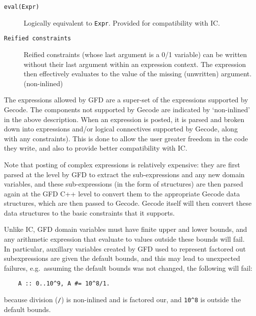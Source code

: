\begin{description}
\item[\texttt{eval(Expr)}]
            Logically equivalent to \verb'Expr'. Provided for compatibility
	    with IC.

\item[\texttt{Reified constraints}]
            Reified constraints (whose last argument is a 0/1 variable)
            can be written without their last argument within
            an expression context.  The expression then effectively
            evaluates to the value of the missing (unwritten) argument.
	    (non-inlined)

\end{description}
 
The expressions allowed by GFD are a super-set of the expressions supported by 
Gecode. The components not supported by Gecode are indicated by `non-inlined'
in the above description. When an expression is posted, it is parsed and 
broken down into expressions and/or logical connectives supported by Gecode, 
along 
with any constraints). This is done to 
allow the user greater freedom in the code they write, and also to provide 
better compatibility with IC. 

Note that posting of complex expressions is relatively expensive: they are 
first parsed at the {\eclipse} level by GFD to extract the sub-expressions and 
any new domain variables, and these sub-expressions (in the form of 
{\eclipse} structures) are then parsed again at the GFD C++ level to convert
them to the appropriate Gecode data structures, which are then passed to
Gecode. Gecode itself will then convert these data structures
to the basic constraints that it supports. 

Unlike IC, GFD domain variables must have finite upper and lower 
bounds, and any arithmetic expression that evaluate to values outside
these bounds will fail. In particular, auxillary variables created by GFD
used to represent factored out subexpressions are given the default bounds,
and this may lead to unexpected failures, e.g.\ assuming the default bounds
was not changed, the following will fail:
\begin{verbatim}
    A :: 0..10^9, A #= 10^8/1.
\end{verbatim}
\noindent
because division (\texttt{/}) is non-inlined and is factored our, and 
\verb|10^8| is outside the default bounds.





